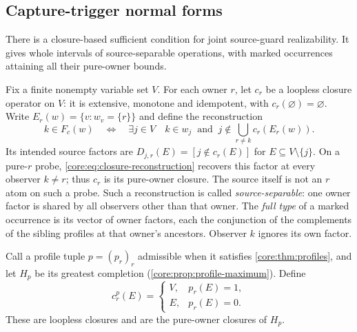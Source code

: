 \subsection{Capture-trigger normal forms}
\label{app:core-capture-triggers}

There is a closure-based sufficient condition for joint source-guard
realizability. It gives whole intervals of source-separable operations,
with marked occurrences attaining all their pure-owner bounds.

Fix a finite nonempty variable set $V$. For each owner $r$, let $c_r$
be a loopless closure operator on $V$: it is extensive, monotone and
idempotent, with $c_r(\varnothing)=\varnothing$. Write
$E_r(w)=\{v:w_v=\{r\}\}$ and define the reconstruction
\begin{equation}\label{core:eq:closure-reconstruction}
 k\in F_c(w)\quad\Longleftrightarrow\quad
 \exists j\in V\quad k\in w_j\ \text{ and }\
 j\notin\bigcup_{r\ne k}c_r(E_r(w)).
\end{equation}
Its intended source factors are
$D_{j,r}(E)=[j\notin c_r(E)]$ for $E\subseteq V\setminus\{j\}$.
On a pure-$r$ probe, \eqref{core:eq:closure-reconstruction} recovers
this factor at every observer $k\ne r$; thus $c_r$ is its pure-owner
closure. The source itself is not an $r$ atom on such a probe.
Such a reconstruction is called \emph{source-separable}: one owner
factor is shared by all observers other than that owner.
The \emph{full type} of a marked occurrence is its vector of owner
factors, each the conjunction of the complements of the sibling
profiles at that owner's ancestors. Observer $k$ ignores its own factor.

Call a profile tuple $p=(p_r)_r$ admissible when it satisfies
\cref{core:thm:profiles}, and let $H_p$ be its greatest completion
(\cref{core:prop:profile-maximum}). Define
\begin{equation}\label{core:eq:profile-upper-closure}
 c_r^p(E)=\begin{cases}V,&p_r(E)=1,\\E,&p_r(E)=0.\end{cases}
\end{equation}
These are loopless closures and are the pure-owner closures of $H_p$.

